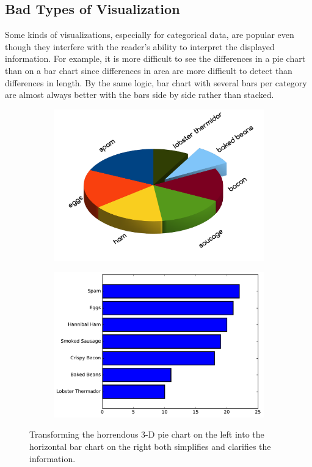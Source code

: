 \subsection*{Bad Types of Visualization} %

Some kinds of visualizations, especially for categorical data, are popular even though they interfere with the reader's ability to interpret the displayed information.
For example, it is more difficult to see the differences in a pie chart than on a bar chart since differences in area are more difficult to detect than differences in length.
By the same logic, bar chart with several bars per category are almost always better with the bars side by side rather than stacked.

\begin{figure}[H] %
\centering
\begin{subfigure}{.49\textwidth}
    \centering
    \includegraphics[width=\textwidth]{figures/bad_pie_chart.png}
\end{subfigure}
%
\begin{subfigure}{.49\textwidth}
    \centering
    \includegraphics[width=\textwidth]{figures/bar_2.pdf}
\end{subfigure}
\caption{Transforming the horrendous 3-D pie chart on the left into the horizontal bar chart on the right both simplifies and clarifies the information.}
\end{figure}

